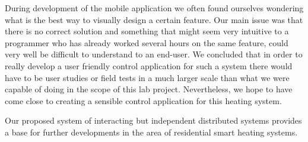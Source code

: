 During development of the mobile application we often found ourselves wondering what is the best way to visually design a certain feature. Our main issue was that there is no correct solution and something that might seem very intuitive to a programmer who has already worked several hours on the same feature, could very well be difficult to understand to an end-user. We concluded that in order to really develop a user friendly control application for such a system there would have to be user studies or field tests in a much larger scale than what we were capable of doing in the scope of this lab project. Nevertheless, we hope to have come close to creating a sensible control application for this heating system.

Our proposed system of interacting but independent distributed systems provides a base for further developments in the area of residential smart heating systems.